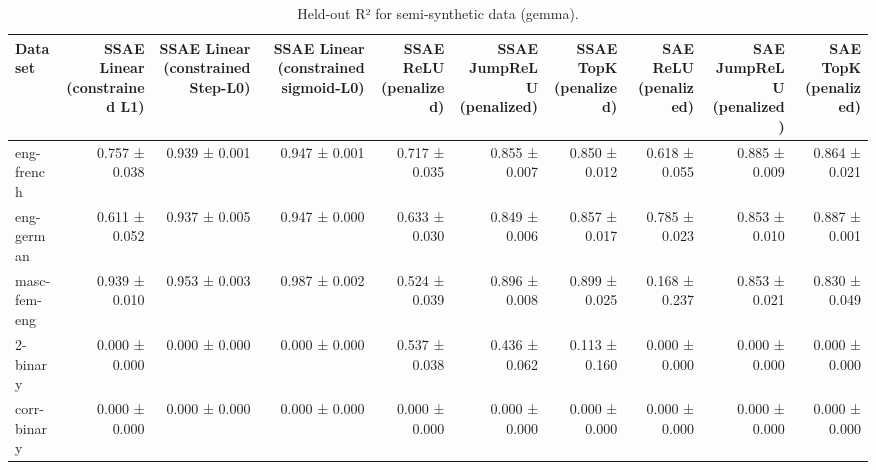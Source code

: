 \begin{table}[t]
\centering
\caption{Held-out R² for semi-synthetic data (gemma).}
\label{tab:semisynthetic-gemma-r2}
\begin{tabular}{lrrrrrrrrr}
\toprule
Dataset & SSAE Linear (constrained L1) & SSAE Linear (constrained Step-L0) & SSAE Linear (constrained sigmoid-L0) & SSAE ReLU (penalized) & SSAE JumpReLU (penalized) & SSAE TopK (penalized) & SAE ReLU (penalized) & SAE JumpReLU (penalized) & SAE TopK (penalized) \\
\midrule
eng-french & 0.757 ± 0.038 & 0.939 ± 0.001 & 0.947 ± 0.001 & 0.717 ± 0.035 & 0.855 ± 0.007 & 0.850 ± 0.012 & 0.618 ± 0.055 & 0.885 ± 0.009 & 0.864 ± 0.021 \\
eng-german & 0.611 ± 0.052 & 0.937 ± 0.005 & 0.947 ± 0.000 & 0.633 ± 0.030 & 0.849 ± 0.006 & 0.857 ± 0.017 & 0.785 ± 0.023 & 0.853 ± 0.010 & 0.887 ± 0.001 \\
masc-fem-eng & 0.939 ± 0.010 & 0.953 ± 0.003 & 0.987 ± 0.002 & 0.524 ± 0.039 & 0.896 ± 0.008 & 0.899 ± 0.025 & 0.168 ± 0.237 & 0.853 ± 0.021 & 0.830 ± 0.049 \\
2-binary & 0.000 ± 0.000 & 0.000 ± 0.000 & 0.000 ± 0.000 & 0.537 ± 0.038 & 0.436 ± 0.062 & 0.113 ± 0.160 & 0.000 ± 0.000 & 0.000 ± 0.000 & 0.000 ± 0.000 \\
corr-binary & 0.000 ± 0.000 & 0.000 ± 0.000 & 0.000 ± 0.000 & 0.000 ± 0.000 & 0.000 ± 0.000 & 0.000 ± 0.000 & 0.000 ± 0.000 & 0.000 ± 0.000 & 0.000 ± 0.000 \\
\bottomrule
\end{tabular}
\end{table}
